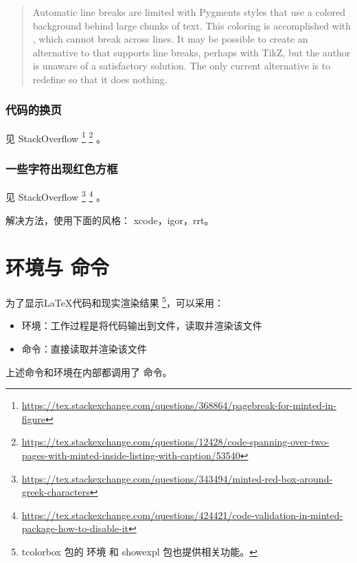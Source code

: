 \begin{quote}
  Automatic line breaks are limited with Pygments styles that use a colored background behind large chunks of text. This coloring is accomplished with ,
  which cannot break across lines. It may be possible to create an alternative to
   that supports line breaks, perhaps with TikZ, but the author is unaware
  of a satisfactory solution. The only current alternative is to redefine  so
  that it does nothing. 
\end{quote}

\subsubsection{代码的换页}

见 StackOverflow
\footnote{\url{https://tex.stackexchange.com/questions/368864/pagebreak-for-minted-in-figure}}
\footnote{\url{https://tex.stackexchange.com/questions/12428/code-spanning-over-two-pages-with-minted-inside-listing-with-caption/53540}}
。

\subsubsection{一些字符出现红色方框}

见 StackOverflow
\footnote{\url{https://tex.stackexchange.com/questions/343494/minted-red-box-around-greek-characters}}
\footnote{\url{https://tex.stackexchange.com/questions/424421/code-validation-in-minted-package-how-to-disable-it}}
。

解决方法，使用下面的风格：
xcode，igor，rrt。

\section{\protect{} 环境与 \protect{} 命令}

为了显示{\LaTeX}代码和现实渲染结果
\footnote{tcolorbox 包的  环境 和 showexpl 包也提供相关功能。}，可以采用：
\begin{itemize}
  \item {} 环境：工作过程是将代码输出到文件，读取并渲染该文件
  \item {} 命令：直接读取并渲染该文件
\end{itemize}

上述命令和环境在内部都调用了  命令。

